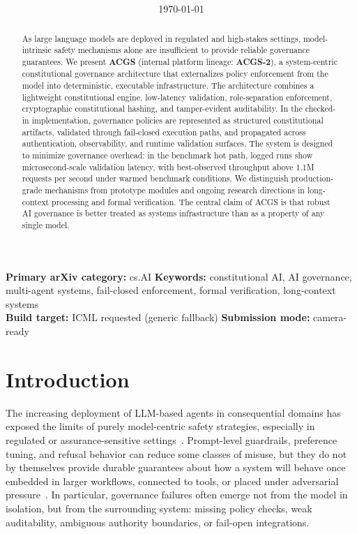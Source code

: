 \documentclass[11pt]{article}
\title{\papertitle\\
\large \papersubtitle}
\author{%
  \ifcameraready
    \cameraauthors
  \else
    \reviewauthors
  \fi
}
\date{\today}
\newcommand{\arxivprimaryclass}{cs.AI}
\newcommand{\paperkeywords}{constitutional AI, AI governance, multi-agent systems, fail-closed enforcement, formal verification, long-context systems}
\newcommand{\venuelabel}{arXiv / generic}
\newcommand{\submissionlabel}{review}
\renewcommand{\venuelabel}{NeurIPS}
\renewcommand{\submissionlabel}{camera-ready}
\renewcommand{\venuelabel}{NeurIPS requested (generic fallback)}
\renewcommand{\venuelabel}{ICML}
\renewcommand{\submissionlabel}{camera-ready}
\renewcommand{\venuelabel}{ICML requested (generic fallback)}
\renewcommand{\submissionlabel}{camera-ready}
\begin{document}
\maketitle

\begin{abstract}
As large language models are deployed in regulated and high-stakes settings, model-intrinsic safety mechanisms alone are insufficient to provide reliable governance guarantees. We present \textbf{ACGS} (internal platform lineage: \textbf{ACGS-2}), a system-centric constitutional governance architecture that externalizes policy enforcement from the model into deterministic, executable infrastructure. The architecture combines a lightweight constitutional engine, low-latency validation, role-separation enforcement, cryptographic constitutional hashing, and tamper-evident auditability. In the checked-in implementation, governance policies are represented as structured constitutional artifacts, validated through fail-closed execution paths, and propagated across authentication, observability, and runtime validation surfaces. The system is designed to minimize governance overhead: in the benchmark hot path, logged runs show microsecond-scale validation latency, with best-observed throughput above 1.1M requests per second under warmed benchmark conditions. We distinguish production-grade mechanisms from prototype modules and ongoing research directions in long-context processing and formal verification. The central claim of ACGS is that robust AI governance is better treated as systems infrastructure than as a property of any single model.
\end{abstract}

\begin{center}
\small
\textbf{Primary arXiv category:} \arxivprimaryclass \qquad
\textbf{Keywords:} \paperkeywords \\
\textbf{Build target:} \venuelabel \qquad
\textbf{Submission mode:} \submissionlabel
\end{center}

\section{Introduction}
The increasing deployment of LLM-based agents in consequential domains has exposed the limits of purely model-centric safety strategies, especially in regulated or assurance-sensitive settings~\cite{nistairmf,euaiact}. Prompt-level guardrails, preference tuning, and refusal behavior can reduce some classes of misuse, but they do not by themselves provide durable guarantees about how a system will behave once embedded in larger workflows, connected to tools, or placed under adversarial pressure~\cite{constitutionalai}. In particular, governance failures often emerge not from the model in isolation, but from the surrounding system: missing policy checks, weak auditability, ambiguous authority boundaries, or fail-open integrations.
\end{document}
